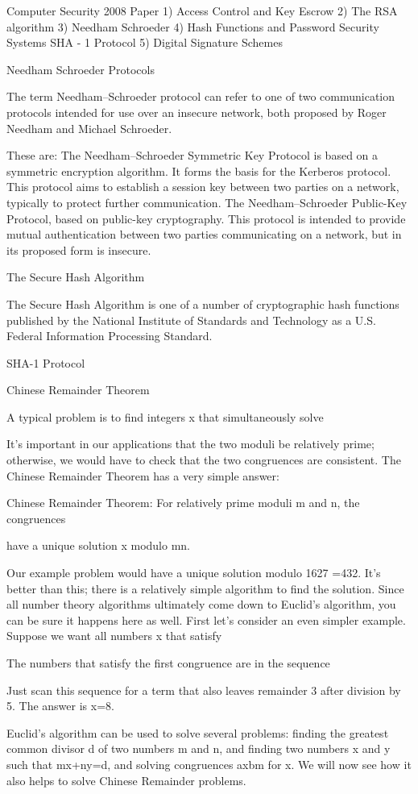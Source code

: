 Computer Security
2008 Paper
1) Access Control and Key Escrow
2) The RSA algorithm
3) Needham Schroeder
4) Hash Functions and Password Security Systems
    SHA - 1 Protocol
5) Digital Signature Schemes

Needham Schroeder Protocols
 
The term Needham–Schroeder protocol can refer to one of two communication protocols intended for use over an insecure network, both proposed by Roger Needham and Michael Schroeder.
 
These are:
The Needham–Schroeder Symmetric Key Protocol is based on a symmetric encryption algorithm. It forms the basis for the Kerberos protocol. This protocol aims to establish a session key between two parties on a network, typically to protect further communication.
The Needham–Schroeder Public-Key Protocol, based on public-key cryptography. This protocol is intended to provide mutual authentication between two parties communicating on a network, but in its proposed form is insecure.

 
The Secure Hash Algorithm
 
The Secure Hash Algorithm is one of a number of cryptographic hash functions published by the National Institute of Standards and Technology as a U.S. Federal Information Processing Standard.

SHA-1 Protocol
 
Chinese Remainder Theorem
 
A typical problem is to find integers x that simultaneously solve 
 
 
 
It's important in our applications that the two moduli be relatively prime; otherwise, we would have to check that the two congruences are consistent. The Chinese Remainder Theorem has a very simple answer:
 
Chinese Remainder Theorem: For relatively prime moduli m and n, the congruences
 



have a unique solution x modulo mn.
 
 
Our example problem would have a unique solution modulo 1627 =432.
It's better than this; there is a relatively simple algorithm to find the solution. Since all number theory algorithms ultimately come down to Euclid's algorithm, you can be sure it happens here as well.
First let's consider an even simpler example. Suppose we want all numbers x that satisfy
 

 
The numbers that satisfy the first congruence are in the sequence 

 


Just scan this sequence for a term that also leaves remainder 3 after division by 5. The answer is x=8.
 
Euclid's algorithm can be used to solve several problems: finding the greatest common divisor d of two numbers m and n, and finding two numbers x and y such that mx+ny=d, and solving congruences axbm  for x. We will now see how it also helps to solve Chinese Remainder problems.
